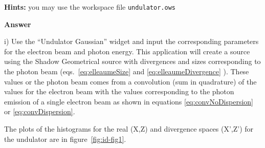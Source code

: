 \textbf{Hints:} you may use the workspace file {\tt undulator.ows}

\textbf{Answer}

i)
Use the “Undulator Gaussian” widget and input the corresponding parameters for the electron beam and photon energy. This application will create a source using the Shadow Geometrical source with divergences and sizes corresponding to the photon beam (eqs.~\ref{eq:elleaumeSize} and \ref{eq:elleaumeDivergence} ). These values or the photon beam comes from a convolution (sum in quadrature) of the values for the electron beam  with the values corresponding to the photon emission of a single electron beam as shown in equations \ref{eq:convNoDispersion} or \ref{eq:convDispersion}.




The plots of the histograms for the real (X,Z) and divergence spaces (X’,Z’) for the undulator are in figure~\ref{fig:id-fig1}.

